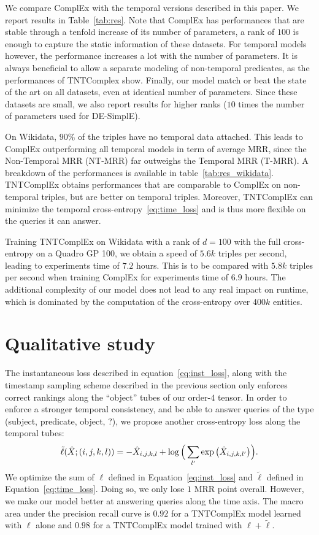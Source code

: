 \documentclass{article}
\newcommand{\empx}{\hat{X}}
\begin{document}
We compare ComplEx with the temporal versions described in this paper. We report results in Table~\ref{tab:res}. Note that ComplEx has performances that are stable through a tenfold increase of its number of parameters, a rank of $100$ is enough to capture the static information of these datasets. For temporal models however, the performance increases a lot with the number of parameters. It is always beneficial to allow a separate modeling of non-temporal predicates, as the performances of TNTComplex show. Finally, our model match or beat the state of the art on all datasets, even at identical number of parameters. Since these datasets are small, we also report results for higher ranks ($10$ times the number of parameters used for DE-SimplE).

On Wikidata, $90\%$ of the triples have no temporal data attached. This leads to ComplEx outperforming all temporal models in term of average MRR, since the Non-Temporal MRR (NT-MRR) far outweighs the Temporal MRR (T-MRR). A breakdown of the performances is available in table~\ref{tab:res_wikidata}. 
TNTComplEx obtains performances that are comparable to ComplEx on non-temporal triples, but are better on temporal triples. Moreover, TNTComplEx can minimize the temporal cross-entropy~\eqref{eq:time_loss} and is thus more flexible on the queries it can answer.

Training TNTComplEx on Wikidata with a rank of $d=100$ with the full cross-entropy on a Quadro GP 100, we obtain a speed of $5.6k$ triples per second, leading to experiments time of $7.2$ hours. This is to be compared with $5.8k$ triples per second when training ComplEx for experiments time of $6.9$ hours. The additional complexity of our model does not lead to any real impact on runtime, which is dominated by the computation of the cross-entropy over $400k$ entities.



\section{Qualitative study}
\label{sec:auxiliary}
The instantaneous loss described in equation~\eqref{eq:inst_loss}, along with the timestamp sampling scheme described in the previous section only enforces correct rankings along the ``object'' tubes of our order-$4$ tensor. In order to enforce a stronger temporal consistency, and be able to answer queries of the type (subject, predicate, object, ?), we propose another cross-entropy loss along the temporal tubes:
\begin{equation}
    \tilde{\ell}(\empx;(i,j,k,l)) = - \empx_{i,j,k,l} + \log\Big(\sum_{l'}\exp\big(\empx_{i,j,k,l'}\big)\Big).
    \label{eq:time_loss}
\vspace{-0.2cm}
\end{equation}
We optimize the sum of $\ell$ defined in Equation~\ref{eq:inst_loss} and $\tilde{\ell}$ defined in Equation~\ref{eq:time_loss}. Doing so, we only lose $1$ MRR point overall. However, we make our model better at answering queries along the time axis. The macro area under the precision recall curve is $0.92$ for a TNTComplEx model learned with $\ell$ alone and $0.98$ for a TNTComplEx model trained with $\ell+\tilde{\ell}$.
\end{document}
